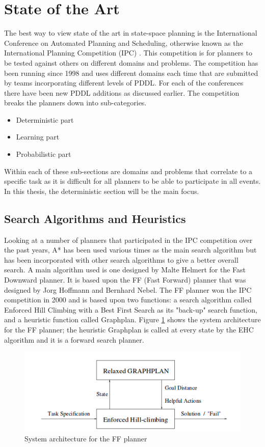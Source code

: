 \section{State of the Art}
The best way to view state of the art in state-space planning is the International Conference on Automated Planning and Scheduling, otherwise known as the International Planning Competition (IPC) \cite{ICAPS}. This competition is for planners to be tested against others on different domains and problems. The competition has been running since 1998 and uses different domains each time that are submitted by teams incorporating different levels of PDDL. For each of the conferences there have been new PDDL additions as discussed earlier. 
The competition breaks the planners down into sub-categories.
\begin{itemize}
\item Deterministic part 
\item Learning part
\item Probabilistic part
\end{itemize}
Within each of these sub-sections are domains and problems that correlate to a specific task as it is difficult for all planners to be able to participate in all events. In this thesis, the deterministic section will be the main focus. 
\subsection{Search Algorithms and Heuristics}
Looking at a number of planners that participated in the IPC competition over the past years, A* has been used various times as the main search algorithm but has been incorporated with other search algorithms to give a better overall search. A main algorithm used is one designed by Malte Helmert for the Fast Downward planner\cite{FastDownward}. It is based upon the FF (Fast Forward) planner that was designed by Jorg Hoffmann and Bernhard Nebel.\cite{FFPlanner} The FF planner won the IPC competition in 2000 and is based upon two functions: a search algorithm called Enforced Hill Climbing with a Best First Search as its "back-up" search function, and a heuristic function called Graphplan. Figure \ref{fig:FFplanner} shows the system architecture for the FF planner; the heuristic Graphplan is called at every state by the EHC algorithm and it is a forward search planner.
 
\begin{figure}[!htb]
    \centering
    \includegraphics[scale=0.7]{FFplanner.png}
    \caption{System architecture for the FF planner}
    \label{fig:FFplanner}
\end{figure}


